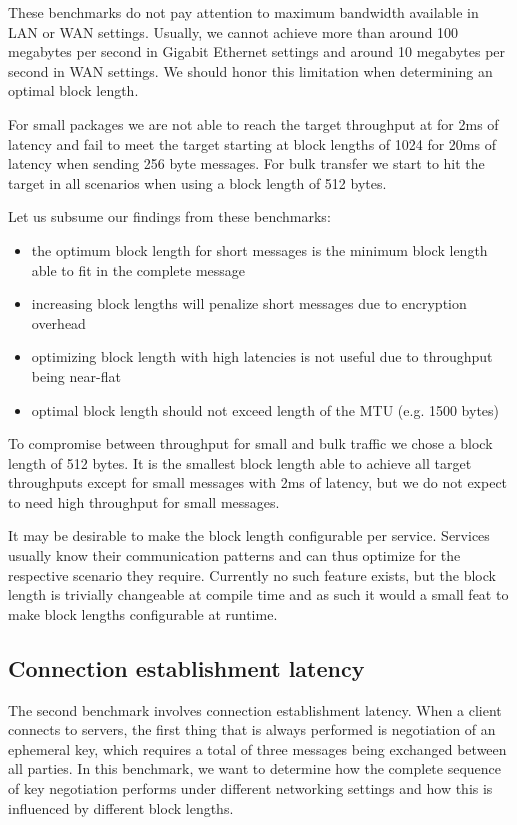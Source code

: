 \medskip

These benchmarks do not pay attention to maximum bandwidth available in LAN or WAN settings.
Usually, we cannot achieve more than around 100 megabytes per second in Gigabit Ethernet settings and around 10 megabytes per second in WAN settings.
We should honor this limitation when determining an optimal block length.

For small packages we are not able to reach the target throughput at for 2ms of latency and fail to meet the target starting at block lengths of 1024 for 20ms of latency when sending 256 byte messages.
For bulk transfer we start to hit the target in all scenarios when using a block length of 512 bytes.

\medskip

Let us subsume our findings from these benchmarks:
\begin{itemize}
    \item the optimum block length for short messages is the minimum block length able to fit in the complete message
    \item increasing block lengths will penalize short messages due to encryption overhead
    \item optimizing block length with high latencies is not useful due to throughput being near-flat
    \item optimal block length should not exceed length of the MTU (e.g. 1500 bytes)
\end{itemize}

To compromise between throughput for small and bulk traffic we chose a block length of 512 bytes.
It is the smallest block length able to achieve all target throughputs except for small messages with 2ms of latency, but we do not expect to need high throughput for small messages.

It may be desirable to make the block length configurable per service.
Services usually know their communication patterns and can thus optimize for the respective scenario they require.
Currently no such feature exists, but the block length is trivially changeable at compile time and as such it would a small feat to make block lengths configurable at runtime.

\subsection{Connection establishment latency}

The second benchmark involves connection establishment latency.
When a client connects to servers, the first thing that is always performed is negotiation of an ephemeral key, which requires a total of three messages being exchanged between all parties.
In this benchmark, we want to determine how the complete sequence of key negotiation performs under different networking settings and how this is influenced by different block lengths.

